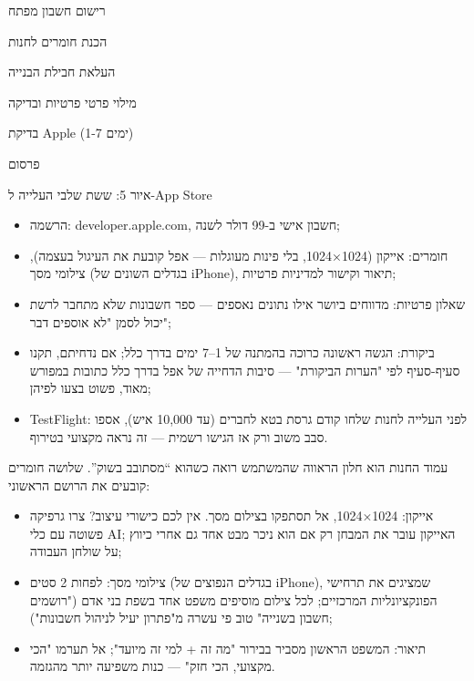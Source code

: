 
רישום חשבון מפתח

הכנת חומרים לחנות

העלאת חבילת הבנייה

מילוי פרטי פרטיות ובדיקה

בדיקת Apple (1-7 ימים)

פרסום

\begin{center}\small\color{gray}איור 5: ששת שלבי העלייה ל-App Store\end{center}

\begin{itemize}
  \item הרשמה: developer.apple.com, חשבון אישי ב-99 דולר לשנה;
  \item חומרים: אייקון (1024×1024, בלי פינות מעוגלות — אפל קובעת את העיגול בעצמה), צילומי מסך (בגדלים השונים של iPhone), תיאור וקישור למדיניות פרטיות;
  \item שאלון פרטיות: מדווחים ביושר אילו נתונים נאספים — ספר חשבונות שלא מתחבר לרשת יכול לסמן "לא אוספים דבר";
  \item ביקורת: הגשה ראשונה כרוכה בהמתנה של 1–7 ימים בדרך כלל; אם נדחיתם, תקנו סעיף-סעיף לפי "הערות הביקורת" — סיבות הדחייה של אפל בדרך כלל כתובות במפורש מאוד, פשוט בצעו לפיהן;
  \item TestFlight: לפני העלייה לחנות שלחו קודם גרסת בטא לחברים (עד 10,000 איש), אספו סבב משוב ורק אז הגישו רשמית — זה נראה מקצועי בטירוף.
\end{itemize}


עמוד החנות הוא חלון הראווה שהמשתמש רואה כשהוא “מסתובב בשוק”. שלושה חומרים קובעים את הרושם הראשוני:

\begin{itemize}
  \item אייקון: 1024×1024, אל תסתפקו בצילום מסך. אין לכם כישורי עיצוב? צרו גרפיקה פשוטה עם כלי AI; האייקון עובר את המבחן רק אם הוא ניכר מבט אחד גם אחרי כיווץ על שולחן העבודה;
  \item צילומי מסך: לפחות 2 סטים (בגדלים הנפוצים של iPhone), שמציגים את תרחישי הפונקציונליות המרכזיים; לכל צילום מוסיפים משפט אחד בשפת בני אדם ("רושמים חשבון בשנייה" טוב פי עשרה מ"פתרון יעיל לניהול חשבונות");
  \item תיאור: המשפט הראשון מסביר בבירור "מה זה + למי זה מיועד"; אל תערמו "הכי מקצועי, הכי חזק" — כנות משפיעה יותר מהגזמה.
\end{itemize}

